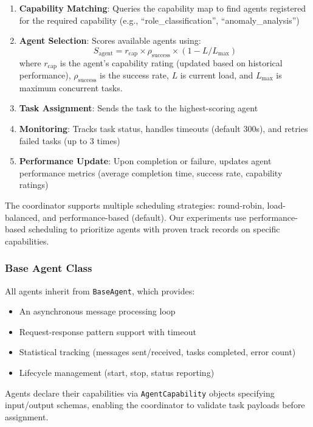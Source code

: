 \begin{enumerate}
    \item \textbf{Capability Matching}: Queries the capability map to find agents registered for the required capability (e.g., ``role\_classification'', ``anomaly\_analysis'')
    \item \textbf{Agent Selection}: Scores available agents using:
    \begin{equation}
    S_{\text{agent}} = r_{\text{cap}} \times \rho_{\text{success}} \times (1 - L / L_{\text{max}})
    \label{eq:agent-score}
    \end{equation}
    where $r_{\text{cap}}$ is the agent's capability rating (updated based on historical performance), $\rho_{\text{success}}$ is the success rate, $L$ is current load, and $L_{\text{max}}$ is maximum concurrent tasks.
    \item \textbf{Task Assignment}: Sends the task to the highest-scoring agent
    \item \textbf{Monitoring}: Tracks task status, handles timeouts (default 300s), and retries failed tasks (up to 3 times)
    \item \textbf{Performance Update}: Upon completion or failure, updates agent performance metrics (average completion time, success rate, capability ratings)
\end{enumerate}

The coordinator supports multiple scheduling strategies: round-robin, load-balanced, and performance-based (default). Our experiments use performance-based scheduling to prioritize agents with proven track records on specific capabilities.

\subsubsection{Base Agent Class}
All agents inherit from \texttt{BaseAgent}, which provides:
\begin{itemize}
    \item An asynchronous message processing loop
    \item Request-response pattern support with timeout
    \item Statistical tracking (messages sent/received, tasks completed, error count)
    \item Lifecycle management (start, stop, status reporting)
\end{itemize}

Agents declare their capabilities via \texttt{AgentCapability} objects specifying input/output schemas, enabling the coordinator to validate task payloads before assignment.


